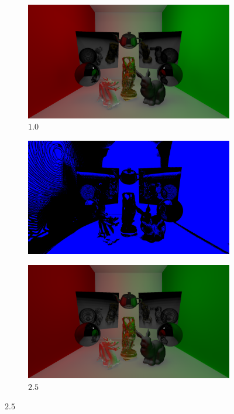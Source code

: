 \begin{figure}[H]
	\centering
	\begin{subfigure}[b]{.49\linewidth}
		\centering
		\captionsetup{justification=centering}
		\caption*{$1.0$}
		\includegraphics[width=\linewidth]{media/finals/test_s100.png}
	\end{subfigure}%
	\hspace{0.01\textwidth}
	\begin{subfigure}[b]{.49\linewidth}
		\centering
		\captionsetup{justification=centering}
		\caption*{}
		\includegraphics[width=\linewidth]{media/finals/test_s100_diff.png}
	\end{subfigure}%
	\par\smallskip
	\begin{subfigure}[b]{.49\linewidth}
		\centering
		\captionsetup{justification=centering}
		\caption*{$2.5$}
		\includegraphics[width=\linewidth]{media/finals/test_s250.png}

\end{subfigure}
\end{figure}
